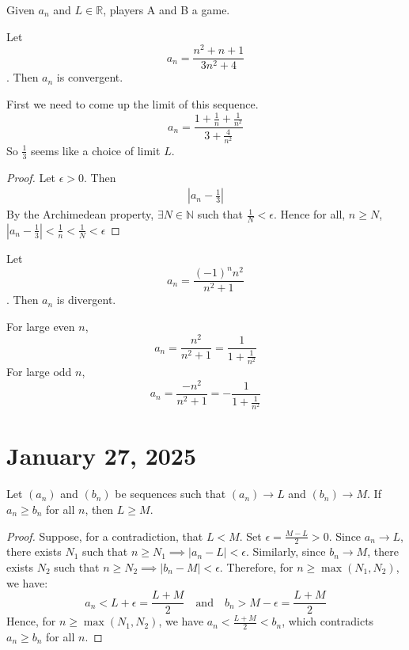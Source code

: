 \documentclass[11pt]{article}
\begin{document}
Given \(a_n\) and \(L \in \mathbb{R}\), players A and B a game. \\

\begin{example}
	Let \[a_n = \frac{n^2 + n + 1}{3n^2 + 4}\]. Then \(a_n\) is convergent.
\end{example}
First we need to come up the limit of this sequence. \\
\[a_n = \frac{1 + \frac{1}{n} + \frac{1}{n^2}}{3 + \frac{4}{n^2}}\]
So \(\frac{1}{3}\) seems like a choice of limit \(L\).
\begin{proof}
	Let \(\epsilon > 0\). Then
	\begin{align*}
		\left| a_n - \frac{1}{3} \right|
	\end{align*}
	By the Archimedean property, \(\exists N \in \mathbb{N}\) such that \(\frac{1}{N} < \epsilon\). Hence for all, \(n \geqslant N\), \(\left| a_n - \frac{1}{3} \right| < \frac{1}{n} < \frac{1}{N} < \epsilon\)
\end{proof}

\begin{example}
	Let \[a_n = \frac{(-1)^n n^2 }{n^2 + 1}\]. Then \(a_n\) is divergent.
\end{example}
For large even \(n\), \[a_n = \frac{n^2}{n^2 + 1} = \frac{1}{1 + \frac{1}{n^2}}\]
For large odd \(n\), \[a_n = \frac{-n^2}{n^2 + 1} = -\frac{1}{1 + \frac{1}{n^2}}\]

\section{January 27, 2025}
\begin{theorem}
	Let $(a_n)$ and $(b_n)$ be sequences such that $(a_n) \to L$ and $(b_n) \to M$. If $a_n \geq b_n$ for all $n$, then $L \geq M$.
\end{theorem}

\begin{proof}
	Suppose, for a contradiction, that $L < M$. Set $\epsilon = \frac{M - L}{2} > 0$. Since $a_n \to L$, there exists $N_1$ such that $n \geq N_1 \implies |a_n - L| < \epsilon$. Similarly, since $b_n \to M$, there exists $N_2$ such that $n \geq N_2 \implies |b_n - M| < \epsilon$. Therefore, for $n \geq \max(N_1, N_2)$, we have:
	\[
		a_n < L + \epsilon = \frac{L + M}{2} \quad \text{and} \quad b_n > M - \epsilon = \frac{L + M}{2}
	\]
	Hence, for $n \geq \max(N_1, N_2)$, we have $a_n < \frac{L + M}{2} < b_n$,
	which contradicts $a_n \geq b_n$ for all $n$.
\end{proof}
\end{document}
